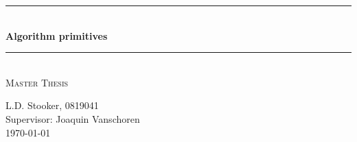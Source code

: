\documentclass[a4paper,10pt]{article}
\begin{document}
\begin{titlepage}

\newcommand{\HRule}{\rule{\linewidth}{0.5mm}} %

\centering %

\HRule \\[0.4cm]
{ \Huge \bfseries Algorithm primitives}\\[0.4cm] %
\HRule \\[1.5cm]


\textsc{\large Master Thesis}\\[1.0cm] %


\vfill %

L.D. Stooker, 0819041 \\ [1cm]
Supervisor: Joaquin Vanschoren \\


{\large \today}\\[3cm] %






\end{titlepage}
\end{document}

